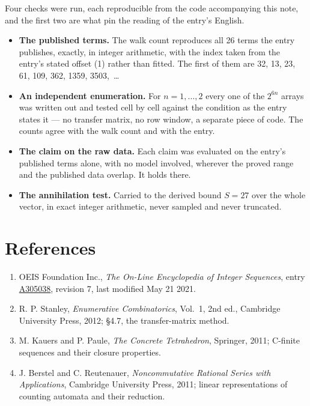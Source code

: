 \documentclass[11pt]{article}
\theoremstyle{definition}
\begin{document}
Four checks were run, each reproducible from the code accompanying this note, and the first two are what pin the reading of the entry's English.

\begin{itemize}

\item {\bfseries The published terms.} The walk count reproduces all 26 terms the entry publishes, exactly, in integer arithmetic, with the index taken from the entry's stated offset (1) rather than fitted. The first of them are 32, 13, 23, 61, 109, 362, 1359, 3503,~\dots

\item {\bfseries An independent enumeration.} For $n = 1,\dots,2$ every one of the $2^{6n}$ arrays was written out and tested cell by cell against the condition as the entry states it --- no transfer matrix, no row window, a separate piece of code. The counts agree with the walk count and with the entry.

\item {\bfseries The claim on the raw data.} Each claim was evaluated on the entry's published terms alone, with no model involved, wherever the proved range and the published data overlap. It holds there.

\item {\bfseries The annihilation test.} Carried to the derived bound $S = 27$ over the whole vector, in exact integer arithmetic, never sampled and never truncated.

\end{itemize}

\section{References}

\begin{enumerate}

\item OEIS Foundation Inc., \emph{The On-Line Encyclopedia of Integer Sequences}, entry \href{https://oeis.org/A305038}{A305038}, revision 7, last modified May 21 2021.

\item R. P. Stanley, \emph{Enumerative Combinatorics}, Vol.~1, 2nd ed., Cambridge University Press, 2012; \S4.7, the transfer-matrix method.

\item M. Kauers and P. Paule, \emph{The Concrete Tetrahedron}, Springer, 2011; C-finite sequences and their closure properties.

\item J. Berstel and C. Reutenauer, \emph{Noncommutative Rational Series with Applications}, Cambridge University Press, 2011; linear representations of counting automata and their reduction.

\end{enumerate}
\end{document}
